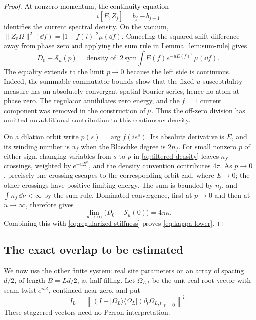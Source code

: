 \begin{proof}
At nonzero momentum, the continuity equation
\[
 i[E,Z_j]=b_j-b_{j-1}
\]
identifies the current spectral density. On the vacuum,
\(\|Z_0\Omega\|^2(\dd f)=|1-f(i)|^2\mu(\dd f)\).
Canceling the squared shift difference away from phase zero and applying
the sum rule in Lemma~\ref{lem:sum-rule} gives
\begin{equation}\label{eq:filtered-density}
 D_0-\mathcal S_u(p)
 =\text{density of }\ 
       2\,\mathrm{sym}\!\int E(f)e^{-uE(f)^2}\,\mu(\dd f).
\end{equation}
The equality extends to the limit \(p\to0\) because the left side
is continuous. Indeed, the summable commutator bounds show that the
fixed-\(u\) susceptibility measure has an absolutely convergent spatial
Fourier series, hence no atom at phase zero. The regulator annihilates
zero energy, and the \(f=1\) current component was removed in the
construction of \(\mu\). Thus the off-zero division has omitted no
additional contribution to this continuous density.

On a dilation orbit write \(p(s)=\arg f(ie^s)\).
Its absolute derivative is \(E\), and its winding number is \(n_f\)
when the Blaschke degree is \(2n_f\). For small nonzero \(p\) of either
sign, changing variables from \(s\) to \(p\) in
\eqref{eq:filtered-density} leaves \(n_f\) crossings, weighted by
\(e^{-uE^2}\), and the density convention contributes \(4\pi\).
As \(p\to0\), precisely one crossing escapes to the corresponding
orbit end, where \(E\to0\); the other crossings have positive limiting
energy. The sum is bounded by \(n_f\), and
\(\int n_f\,\dd\nu<\infty\) by the sum rule. Dominated convergence,
first at \(p\to0\) and then at \(u\to\infty\), therefore gives
\[
 \lim_{u\to\infty}\bigl(D_0-\mathcal S_u(0)\bigr)=4\pi\kappa.
\]
Combining this with \eqref{eq:regularized-stiffness} proves
\eqref{eq:kappa-lower}.
\end{proof}

\subsection{The exact overlap to be estimated}

We now use the other finite system: real site parameters on an array
of spacing \(d/2\), of length \(B=Ld/2\), at half filling.
Let \(\Omega_{L,t}\) be the unit real-root vector with seam twist
\(e^{itZ}\), continued near zero, and put
\begin{equation}\label{eq:fidelity-cost}
 I_L=\left\|(I-|\Omega_L\rangle\langle\Omega_L|)
           \partial_t\Omega_{L,t}\big|_{t=0}\right\|^2.
\end{equation}
These staggered vectors need no Perron interpretation.

